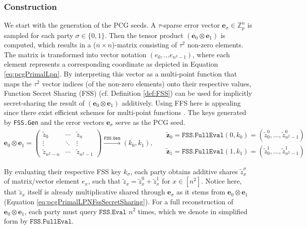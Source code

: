 \subsubsection{Construction}
We start with the generation of the PCG seeds. A $\tau$-sparse error vector $\mathbf{e}_\sigma \in \mathbb{Z}_p^n$ is sampled for each party $\sigma\in\{0,1\}$. Then the tensor product $(\mathbf{e}_0 \otimes \mathbf{e}_1)$ is computed, which results in a ($n\times n$)-matrix consisting of $\tau^2$ non-zero elements. The matrix is transformed into vector notation $(e_0, ... e_{n^2-1})$, where each element represents a corresponding coordinate as depicted in Equation \ref{eq:pcgPrimalLpn}. By interpreting this vector as a multi-point function that maps the $\tau^2$ vector indices (of the non-zero elements) onto their respective values, Function Secret Sharing (FSS) (cf. Definition \ref{def:FSS}) can be used for implicitly secret-sharing the result of $(\mathbf{e}_0 \otimes \mathbf{e}_1)$ additively. Using FFS here is appealing since there exist efficient schemes for multi-point functions \cite{boyle2015function, boyle2016function}. The keys generated by \texttt{FSS.Gen} and the error vectors $\mathbf{e}_\sigma$ serve as the PCG seed.
\begin{equation}
\label{eq:pcgPrimalLpn}
\mathbf{e}_0 \otimes \mathbf{e}_1 = 
\begin{pmatrix}
\tilde{z}_{0} & \cdots & \tilde{z}_{n} \\
\vdots & \ddots & \vdots \\
\tilde{z}_{n^2-n} & \cdots & \tilde{z}_{n^2-1}
\end{pmatrix}
\overset{\texttt{FSS.Gen}}{\longrightarrow}
(k_0, k_1), \:\:\:
\begin{aligned}
& \mathbf{\tilde{z}}_0 = \texttt{FSS.FullEval}(0, k_0) = (\tilde{z}_{0}^0, \ldots, \tilde{z}_{n^2-1}^0) \\
& \mathbf{\tilde{z}}_1 = \texttt{FSS.FullEval}(1, k_1) = (\tilde{z}_{0}^1, \ldots, \tilde{z}_{n^2-1}^1)
\end{aligned}
\end{equation}

By evaluating their respective FSS key $k_\sigma$, each party obtains additive shares $\tilde{z}_x^\sigma$ of matrix/vector element $e_x$, such that $\tilde{z}_x = \tilde{z}_x^0 + \tilde{z}_x^1$ for $ x\in [n^{2}]$. Notice here, that $\tilde{z}_x$ itself is already multiplicative shared through $\mathbf{e}_\sigma$ as it stems from $\mathbf{e}_0 \otimes \mathbf{e}_1$ (Equation \ref{eq:pcgPrimalLPNFssSecretSharing}). For a full reconstruction of $\mathbf{e}_0 \otimes \mathbf{e}_1$, each party must query $\texttt{FSS.Eval}$ $n^2$ times, which we denote in simplified form by $\texttt{FSS.FullEval}$.

